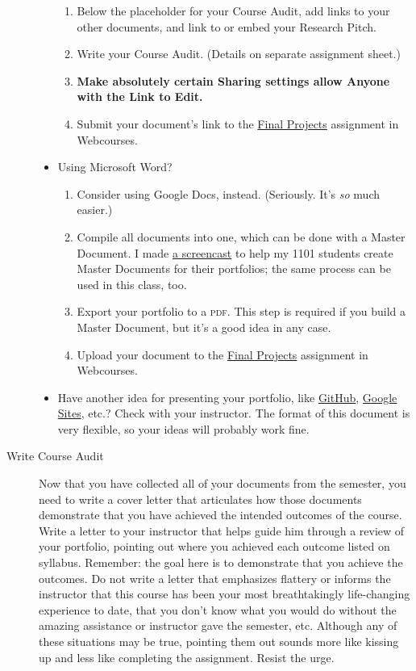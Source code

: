 \documentclass[10pt,oneside]{amsart}	%
\begin{document}
\begin{description}
\begin{itemize}
\begin{enumerate}
			\item Below the placeholder for your Course Audit, add links to your other documents, and link to or embed your Research Pitch.
			\item Write your Course Audit. (Details on separate assignment sheet.)
			\item \textbf{Make absolutely certain Sharing settings allow Anyone with the Link to Edit.}
			\item Submit your document's link to the \href{https://webcourses2c.instructure.com/courses/982699/assignments/2778222}{Final Projects} assignment in Webcourses.
		\end{enumerate}
		\item Using Microsoft Word?
		\begin{enumerate}
			\item Consider using Google Docs, instead. (Seriously. It's \emph{so} much easier.)
			\item Compile all documents into one, which can be done with a Master Document. I made \href{https://vimeo.com/32419592}{a screencast} to help my 1101 students create Master Documents for their portfolios; the same process can be used in this class, too.
			\item Export your portfolio to a \textsc{pdf}. This step is required if you build a Master Document, but it's a good idea in any case.
			\item Upload your document to the \href{https://webcourses2c.instructure.com/courses/982699/assignments/2778222}{Final Projects} assignment in Webcourses.
		\end{enumerate}
		\item Have another idea for presenting your portfolio, like \href{https://github.com}{GitHub}, \href{https://sites.google.com}{Google Sites}, etc.? Check with your instructor. The format of this document is very flexible, so your ideas will probably work fine.
	\end{itemize}
	\item[Write Course Audit] Now that you have collected all of your documents from the semester, you need to write a cover letter that articulates how those documents demonstrate that you have achieved the intended outcomes of the course. Write a letter to your instructor that helps guide him through a review of your portfolio, pointing out where you achieved each outcome listed on syllabus. Remember: the goal here is to demonstrate that you achieve the outcomes. Do not write a letter that emphasizes flattery or informs the instructor that this course has been your most breathtakingly life-changing experience to date, that you don't know what you would do without the amazing assistance or instructor gave the semester, etc. Although any of these situations may be true, pointing them out sounds more like kissing up and less like completing the assignment. Resist the urge.
	

\end{description}
\end{document}
